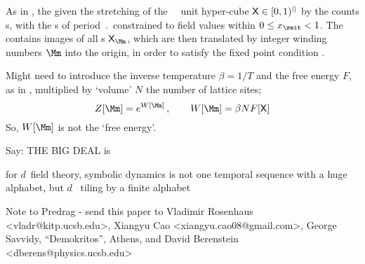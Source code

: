 \begin{description}
{As in , the {\fundPip} given the stretching of the
\cl{}\dmn\ \statesp\ unit hyper-cube $\mathsf{X}\in[0,1)^{||}$ by the
{\jacobianOrb} counts {\lattstate}s, with the {\admissible} {\lattstate}s
of period $\period{}$ constrained to field values within
$0\leq\ssp_\zeit<1$. The {\fundPip} contains images of all {\lattstate}s
$\Xx_\Mm$, which are then translated by integer winding numbers $\Mm$
into the origin, in order to satisfy the fixed point condition
.

    }


     {
    Might need to introduce the inverse temperature $\beta = 1/T$ and the
    free energy $F$, as in , multiplied by `volume' $N$
    the number of lattice sites;
\[
  Z[\source]	= e^{W[\source]}
  \,,\qquad
  W[\source] = \beta N F[\Xx]
\]
    So, $W[\source]$ is not the `free energy'.
    }

 {
Say: THE BIG DEAL is

for $d$\dmn\ field theory, symbolic dynamics is not one temporal sequence
with a huge alphabet, but $d$\dmn\ {\spt} tiling by a finite alphabet
   }

\end{description}


\bigskip\bigskip

\noindent
Note to Predrag - send this paper to
Vladimir Rosenhaus  <vladr@kitp.ucsb.edu>,
Xiangyu Cao <xiangyu.cao08@gmail.com>,
George Savvidy, ``Demokritos'', Athens,
and
David Berenstein <dberens@physics.ucsb.edu>
